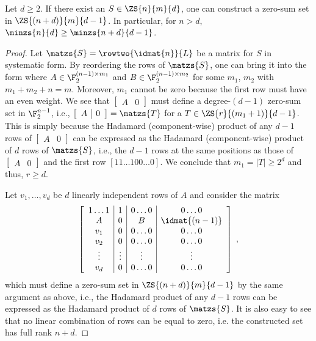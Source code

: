 \begin{proposition}
Let $d \geq 2$. If there exist an $S \in \ZS{n}{m}{d}$, one can construct a zero-sum set in $\ZS{(n+d)}{m}{d-1}$. In particular, for $n > d$, $\minzs{n}{d} \geq \minzs{n+d}{d-1}$.
\end{proposition}
\begin{proof}
Let $\matzs{S} = \rowtwo{\idmat{n}}{L}$ be a matrix for $S$ in systematic form. By reordering the rows of $\matzs{S}$, one can bring it into the form 
where $A \in \F_2^{(n-1) \times m_1}$ and $B \in \F_2^{(n-1) \times m_2}$ for some $m_1$, $m_2$ with $m_1+m_2+n = m$. Moreover, $m_1$ cannot be zero because the first row must have an even weight.
We see that $\left[\begin{array}{c|c} A &  0\end{array}\right]$ must define a degree-$(d-1)$ zero-sum set in $\F_2^{n-1}$, i.e., $\left[\begin{array}{c|c} A &  0\end{array}\right] = \matzs{T}$ for a $T \in \ZS{r}{(m_1+1)}{d-1}$. This is simply because the Hadamard (component-wise) product of any $d-1$ rows of $\left[\begin{array}{c|c} A &  0\end{array}\right]$ can be expressed as the Hadamard (component-wise) product of $d$ rows of $\matzs{S}$, i.e., the $d-1$ rows at the same positions as those of $\left[\begin{array}{c|c} A &  0\end{array}\right]$ and the first row $[1 1 \dots 1 0 0 \dots 0]$. We conclude that $m_1 = |T| \geq 2^d$ and thus, $r \geq d$. 

Let $v_1,\dots,v_d$ be $d$ linearly independent rows of $A$ and consider the matrix
\[ \left[ \begin{array}{c|c|c|c} 
1 \dots 1 & 1 & 0 \dots 0 & 0 \dots 0 \\
A & 0 & B & \idmat{(n-1)} \\
v_1 & 0 & 0 \dots 0 & 0 \dots 0\\
v_2 & 0 & 0 \dots 0 & 0 \dots 0\\
\vdots & \vdots & \vdots &  \vdots \\
v_d & 0 & 0 \dots 0 & 0 \dots 0\\
\end{array} \right]\;,\]
which must define a zero-sum set in $\ZS{(n+d)}{m}{d-1}$ by the same argument as above, i.e., the Hadamard product of any $d-1$ rows can be expressed as the Hadamard product of $d$ rows of $\matzs{S}$. It is also easy to see that no linear combination of rows can be equal to zero, i.e. the constructed set has full rank $n+d$.
\end{proof}

